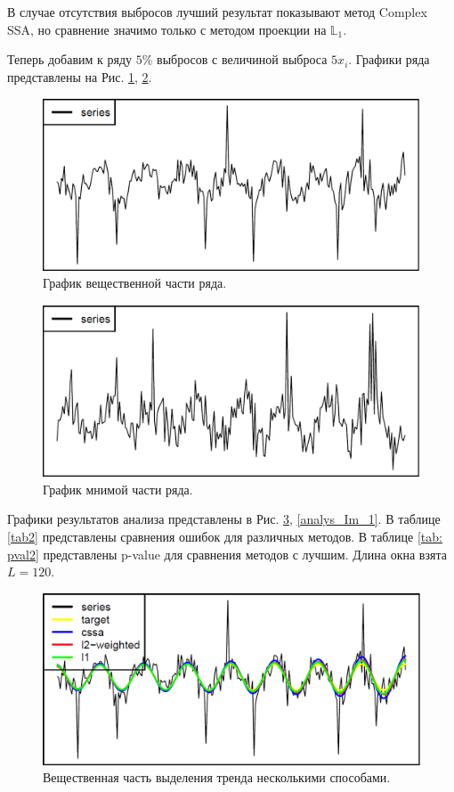 \documentclass[specialist,
               substylefile = spbu.rtx,
               subf,href,colorlinks=true, 12pt]{disser}
\begin{document}
В случае отсутствия выбросов лучший результат показывают метод Complex SSA, но сравнение значимо только с методом проекции на $\mathbb{L}_1$.

Теперь добавим к ряду $5\%$ выбросов с величиной выброса $5x_i$. Графики ряда представлены на Рис. \ref{ser_Re_1}, \ref{ser_Im_1}.

\begin{figure}[H]
	\begin{center}
		\includegraphics[width=0.67\linewidth]{ser_1_Re.png}
	\end{center}
	\caption{График вещественной части ряда.}
	\label{ser_Re_1}
\end{figure}

\begin{figure}[H]
	\begin{center}
		\includegraphics[width=0.67\linewidth]{ser_1_Im.png}
	\end{center}
	\caption{График мнимой части ряда.}
	\label{ser_Im_1}
\end{figure}

Графики результатов анализа представлены в Рис. \ref{analys_Re_1}, \ref{analys_Im_1}. В таблице \ref{tab2} представлены сравнения ошибок для различных методов.  В таблице \ref{tab: pval2} представлены p-value для сравнения методов с лучшим. Длина окна взята $L = 120$.

\begin{figure}[H]
	\begin{center}
		\includegraphics[width=0.67\linewidth]{analys_1_Re.png}
	\end{center}
	\caption{Вещественная часть выделения тренда несколькими способами.}
	\label{analys_Re_1}
\end{figure}
\end{document}
